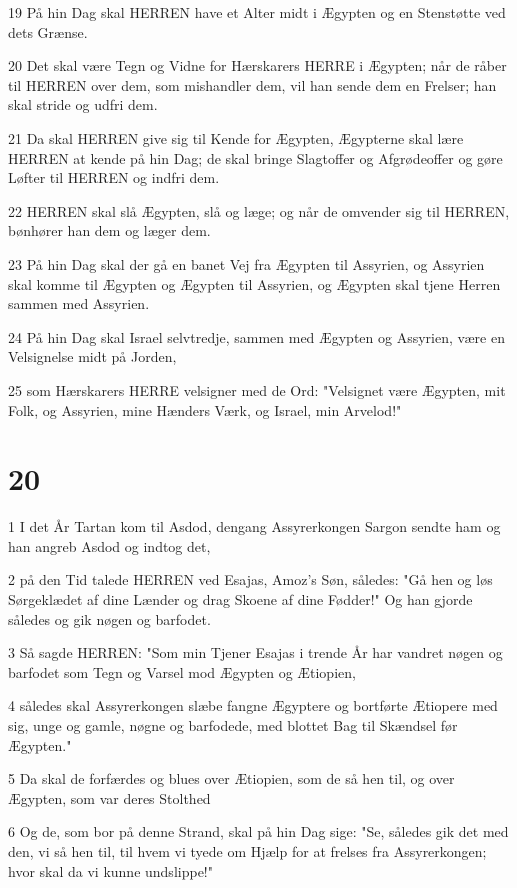 \par 19 På hin Dag skal HERREN have et Alter midt i Ægypten og en Stenstøtte ved dets Grænse.
\par 20 Det skal være Tegn og Vidne for Hærskarers HERRE i Ægypten; når de råber til HERREN over dem, som mishandler dem, vil han sende dem en Frelser; han skal stride og udfri dem.
\par 21 Da skal HERREN give sig til Kende for Ægypten, Ægypterne skal lære HERREN at kende på hin Dag; de skal bringe Slagtoffer og Afgrødeoffer og gøre Løfter til HERREN og indfri dem.
\par 22 HERREN skal slå Ægypten, slå og læge; og når de omvender sig til HERREN, bønhører han dem og læger dem.
\par 23 På hin Dag skal der gå en banet Vej fra Ægypten til Assyrien, og Assyrien skal komme til Ægypten og Ægypten til Assyrien, og Ægypten skal tjene Herren sammen med Assyrien.
\par 24 På hin Dag skal Israel selvtredje, sammen med Ægypten og Assyrien, være en Velsignelse midt på Jorden,
\par 25 som Hærskarers HERRE velsigner med de Ord: "Velsignet være Ægypten, mit Folk, og Assyrien, mine Hænders Værk, og Israel, min Arvelod!"

\chapter{20}

\par 1 I det År Tartan kom til Asdod, dengang Assyrerkongen Sargon sendte ham og han angreb Asdod og indtog det,
\par 2 på den Tid talede HERREN ved Esajas, Amoz's Søn, således: "Gå hen og løs Sørgeklædet af dine Lænder og drag Skoene af dine Fødder!" Og han gjorde således og gik nøgen og barfodet.
\par 3 Så sagde HERREN: "Som min Tjener Esajas i trende År har vandret nøgen og barfodet som Tegn og Varsel mod Ægypten og Ætiopien,
\par 4 således skal Assyrerkongen slæbe fangne Ægyptere og bortførte Ætiopere med sig, unge og gamle, nøgne og barfodede, med blottet Bag til Skændsel før Ægypten."
\par 5 Da skal de forfærdes og blues over Ætiopien, som de så hen til, og over Ægypten, som var deres Stolthed
\par 6 Og de, som bor på denne Strand, skal på hin Dag sige: "Se, således gik det med den, vi så hen til, til hvem vi tyede om Hjælp for at frelses fra Assyrerkongen; hvor skal da vi kunne undslippe!"

